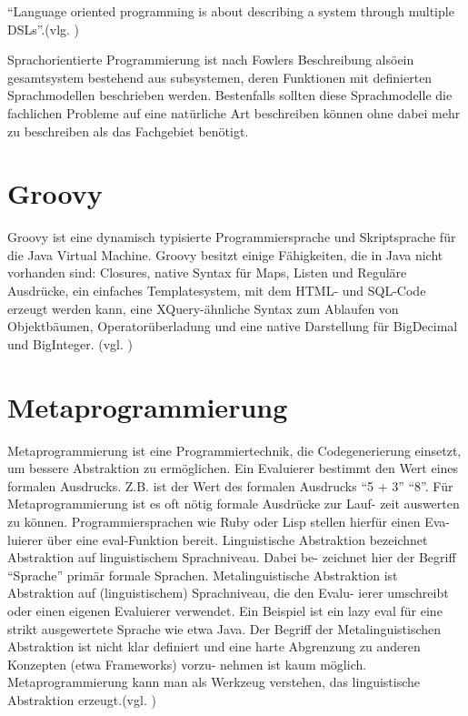 \documentclass[11pt,english,ngerman, headsepline]{scrreprt}
\begin{document}
``Language oriented programming is about describing a system through multiple
DSLs''.(vlg. \cite{fowler2005language})

Sprachorientierte Programmierung ist nach Fowlers Beschreibung alsöein
gesamtsystem bestehend aus subsystemen, deren Funktionen mit definierten
Sprachmodellen beschrieben werden. Bestenfalls sollten diese Sprachmodelle
die fachlichen Probleme auf eine natürliche Art beschreiben können ohne dabei
mehr zu beschreiben als das Fachgebiet benötigt.

\section{Groovy}

Groovy ist eine dynamisch typisierte Programmiersprache und Skriptsprache für
die Java Virtual Machine.
Groovy besitzt einige Fähigkeiten, die in Java nicht vorhanden sind: Closures,
native Syntax für Maps, Listen und Reguläre Ausdrücke, ein einfaches
Templatesystem, mit dem HTML- und SQL-Code erzeugt werden kann, eine
XQuery-ähnliche Syntax zum Ablaufen von Objektbäumen, Operatorüberladung und
eine native Darstellung für BigDecimal und BigInteger. (vgl. \cite{wikigroovy})



\section{Metaprogrammierung}\label{metaprogrammingLabel}

Metaprogrammierung ist eine Programmiertechnik, die Codegenerierung einsetzt, um
bessere Abstraktion zu ermöglichen.
Ein Evaluierer bestimmt den Wert eines formalen Ausdrucks. Z.B. ist der Wert des
formalen Ausdrucks “5 + 3” “8”. Für Metaprogrammierung ist es oft nötig
formale Ausdrücke zur Lauf- zeit auswerten zu können. Programmiersprachen wie
Ruby oder Lisp stellen hierfür einen Eva- luierer über eine eval-Funktion
bereit.
Linguistische Abstraktion bezeichnet Abstraktion auf linguistischem
Sprachniveau. Dabei be- zeichnet hier der Begriff “Sprache” primär formale
Sprachen.
Metalinguistische Abstraktion ist Abstraktion auf (linguistischem) Sprachniveau,
die den Evalu- ierer umschreibt oder einen eigenen Evaluierer verwendet. Ein
Beispiel ist ein lazy eval für eine strikt ausgewertete Sprache wie etwa Java.
Der Begriff der Metalinguistischen Abstraktion ist nicht klar definiert und eine
harte Abgrenzung zu anderen Konzepten (etwa Frameworks) vorzu- nehmen ist kaum
möglich.
Metaprogrammierung kann man als Werkzeug verstehen, das linguistische
Abstraktion erzeugt.(vgl. \cite{biekermetaprogrammierung})
\end{document}
